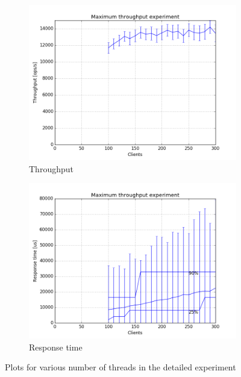 \documentclass[11pt]{article}
\begin{document}
\begin{figure}
\centering
\begin{subfigure}{.5\textwidth}
	\centering
	\includegraphics[width=\linewidth]{plots/max_throughput_all_detailed}
	\caption{Throughput}
\end{subfigure}%
\begin{subfigure}{.5\textwidth}
	\centering
	\includegraphics[width=\linewidth]{plots/max_throughput-response_time_all_detailed}
	\caption{Response time}
\end{subfigure}
\caption{Plots for various number of threads in the detailed experiment}
\label{fig:max-throughput-detailed}
\end{figure}
\end{document}
